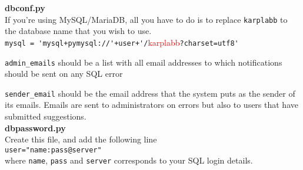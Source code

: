 \documentclass[
12pt, %
a4paper, %
oneside, %
headinclude,footinclude, %
BCOR0mm, %
]{scrartcl}
\begin{document}
\textbf{dbconf.py}\\
    If you're using MySQL/MariaDB, all you have to do is to replace \verb|karplabb| to the database name
    that you wish to use.\\
    \verb|mysql = 'mysql+pymysql://'+user+'/|\textcolor{red}{karplabb}\verb|?charset=utf8'|

    \verb|admin_emails| should be a list with all email addresses to which notifications
    should be sent on any SQL error

\verb|sender_email| should be the email address that the system puts as the sender of its emails. Emails
are sent to administrators on errors but also to users that have submitted suggestions. \\

\textbf{dbpassword.py}\\
  Create this file, and add the following line\\
  \verb|user="name:pass@server"|\\
  where \verb|name|, \verb|pass| and \verb|server| corresponds to your SQL login details.\\
\end{document}
